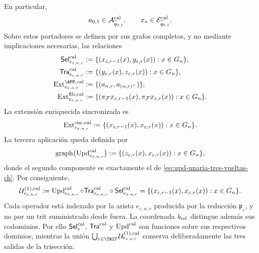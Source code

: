 En particular,
\[
 a_{0,1}\in\mathcal A^{\rm cal}_{\widetilde q_{0,1}},
 \qquad
 x_\star\in\mathcal E^{\rm cal}_{\widetilde q_{0,1}}.
\]
Sobre estos portadores se
definen por sus grafos completos, y no mediante implicaciones necesarias, las
relaciones
\begin{align}
 \mathsf{Sel}^{\rm cal}_{e_{\varepsilon,n,r}}
   &:=\{(x_{\varepsilon,r-1}(x),y_{\varepsilon,r}(x)):
          x\in G_n\},\\
 \mathsf{Tra}^{\rm cal}_{e_{\varepsilon,n,r}}
   &:=\{(y_{\varepsilon,r}(x),z_{\varepsilon,r}(x)):
          x\in G_n\},\\
 \operatorname{Ext}^{\APP,\rm cal}_{e_{\varepsilon,n,r}}
   &:=\{(a_{n,r},a_{(n,r)^+})\},
 \label{eq:ext-app-calibrada-ch}\\
 \operatorname{Ext}^{\rm fib,cal}_{e_{\varepsilon,n,r}}
   &:=\{(\pi_{\mathcal F}x_{\varepsilon,r-1}(x),
          \pi_{\mathcal F}x_{\varepsilon,r}(x)):x\in G_n\}.
 \label{eq:ext-fibra-calibrada-ch}
\end{align}
La extensión enriquecida sincronizada es
\begin{equation}
 \operatorname{Ext}^{\rm enr,cal}_{e_{\varepsilon,n,r}}
 :=\{(x_{\varepsilon,r-1}(x),x_{\varepsilon,r}(x)):
       x\in G_n\}.
 \label{eq:ext-enriquecida-calibrada-ch}
\end{equation}
La tercera aplicación queda definida por
\begin{equation}
 \operatorname{graph}
 \bigl(\operatorname{Upd}^{\rm cal}_{e_{\varepsilon,n,r}}\bigr)
 :=\{(z_{\varepsilon,r}(x),x_{\varepsilon,r}(x)):
       x\in G_n\},
 \label{eq:grafo-upd-calibrado-ch}
\end{equation}
donde el segundo componente es exactamente el de
\eqref{eq:upd-unaria-tres-vueltas-ch}. Por consiguiente,
\begin{equation}
 \mathcal U^{(1),\rm cal}_{e_{\varepsilon,n,r}}
 :=\operatorname{Upd}^{\rm cal}_{e_{\varepsilon,n,r}}\circ
   \mathsf{Tra}^{\rm cal}_{e_{\varepsilon,n,r}}\circ
   \mathsf{Sel}^{\rm cal}_{e_{\varepsilon,n,r}}
 =\{(x_{\varepsilon,r-1}(x),x_{\varepsilon,r}(x)):
      x\in G_n\}.
 \label{eq:transicion-cal-en-tpk-ch}
\end{equation}
Cada operador está indexado por la arista
\(e_{\varepsilon,n,r}\) producida por la reducción
\(\mathfrak p_\varepsilon\), y no por un trit suministrado desde fuera. La
coordenada \(b_{\rm ref}\) distingue además sus codominios. Por ello
\(\mathsf{Sel}^{\rm cal}_{e}\),
\(\mathsf{Tra}^{\rm cal}\) y \(\operatorname{Upd}^{\rm cal}\) son funciones
sobre sus respectivos dominios, mientras
la unión
\(\bigcup_{\varepsilon\in\TRIT}
\mathcal U^{(1),\rm cal}_{e_{\varepsilon,n,r}}\) conserva deliberadamente
las tres salidas de la trisección.

